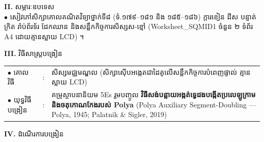 \documentclass[a4paper,10pt]{article}
\newcommand{\en}[1]{{\TimesEn #1}}
\begin{document}
{\vspace{1pt}

\textbf{II.} {\muol សម្ភារៈឧបទេស}\\[1pt]
\hspace*{0.55cm}$\bullet$ \hspace{0.35cm} សៀវភៅសិក្សាគោលគណិតវិទ្យាថ្នាក់ទី៨ (ទំ.១៧៩--១៨១ និង ១៨៥--១៨៦) ក្ដារខៀន ដីស បន្ទាត់ក្រិត រ៉ាប់ព័រទ័រ ដែកឈាន និងសន្លឹកកិច្ចការសិស្សស-ខ្មៅ (\en{Worksheet\_SQMID1} ចំនួន ២ ទំព័រ \en{A4} ដោយគ្មានស្លាយ \en{LCD}) ។

\vspace{1pt}

\textbf{III.} {\muol វិធីសាស្រ្តបង្រៀន}\\[1pt]
\hspace*{0.45cm}%
\begin{tabular}{@{}l l L{14.85cm}@{}}
  $\bullet$ \hspace{0.25cm} គោលវិធី & : & សិស្សមជ្ឈមណ្ឌល (សិក្សាស៊ើបអង្កេតជាដៃគូលើសន្លឹកកិច្ចការបំពេញផ្ទាល់ គ្មានស្លាយ \en{LCD}) \\
  $\bullet$ \hspace{0.25cm} យុទ្ធវិធីបង្រៀន & : & គម្រូស្ថាបនានិយម \en{5Es} រួមបញ្ចូល \textbf{វិធីសង់បន្លាយអង្កត់ទ្វេដងបង្កើតប្រលេឡូក្រាម និងចតុកោណកែងរបស់ Polya} (\en{Polya Auxiliary Segment-Doubling — Polya, 1945; Palatnik \& Sigler, 2019}) \\
\end{tabular}
}

\vspace{1pt}

\textbf{IV.} {\muol ដំណើរការបង្រៀន}

\vspace{1pt}
\end{document}

